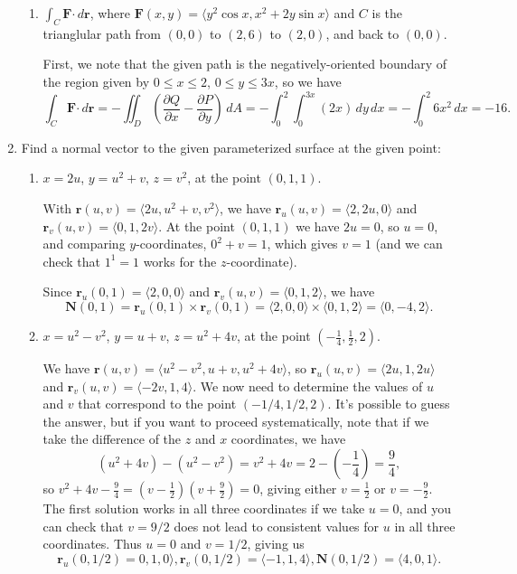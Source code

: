 \documentclass[letterpaper,12pt]{article}
\newcommand{\pd}[2]{\dfrac{\partial #1}{\partial #2}}
\renewcommand{\r}{\mathbf{r}}
\newcommand{\dotp}{\boldsymbol{\cdot}}
\newcommand{\F}{\mathbf{F}}
\newcommand{\N}{\mathbf{N}}
\begin{document}
\begin{enumerate}
\begin{enumerate}
 \item $\int_C \F\dotp \,d\r$, where $\F(x,y) = \langle y^2\cos x, x^2+2y\sin x\rangle$ and $C$ is the trianglular path from $(0,0)$ to $(2,6)$ to $(2,0)$, and back to $(0,0)$.

\bigskip

First, we note that the given path is the negatively-oriented boundary of the region given by $0\leq x\leq 2$, $0\leq y\leq 3x$, so we have
\[
 \int_C \F\dotp \,d\r = -\iint_D\left(\pd{Q}{x}-\pd{P}{y}\right)\,dA = -\int_0^2\int_0^{3x}(2x)\,dy\,dx = -\int_0^2 6x^2\,dx = -16.
\]

\end{enumerate}
 \item Find a normal vector to the given parameterized surface at the given point:
\begin{enumerate}
 \item $x=2u$, $y=u^2+v$, $z=v^2$, at the point $(0,1,1)$.

\bigskip

With $\r(u,v) = \langle 2u, u^2+v,v^2\rangle$, we have $\r_u(u,v) = \langle 2, 2u, 0\rangle$ and $\r_v(u,v) = \langle 0, 1, 2v\rangle$. At the point $(0,1,1)$ we have $2u=0$, so $u=0$, and comparing $y$-coordinates, $0^2+v=1$, which gives $v=1$ (and we can check that $1^1=1$ works for the $z$-coordinate).

Since $\r_u(0,1) = \langle 2, 0, 0\rangle$ and $\r_v(u,v) = \langle 0, 1, 2\rangle$, we have
\[
 \N(0,1) = \r_u(0,1)\times \r_v(0,1) = \langle 2,0,0\rangle\times\langle 0,1,2\rangle = \langle 0,-4,2\rangle.
\]

 \item $x=u^2-v^2$, $y=u+v$, $z=u^2+4v$, at the point $(-\frac{1}{4}, \frac{1}{2}, 2)$.

\bigskip

We have $\r(u,v) = \langle u^2-v^2, u+v,u^2+4v\rangle$, so $\r_u(u,v) = \langle 2u, 1, 2u\rangle$ and $\r_v(u,v) = \langle -2v, 1, 4\rangle$. We now need to determine the values of $u$ and $v$ that correspond to the point $(-1/4, 1/2, 2)$. It's possible to guess the answer, but if you want to proceed systematically, note that if we take the difference of the $z$ and $x$ coordinates, we have
\[
 (u^2+4v)-(u^2-v^2) = v^2+4v= 2-\left(-\frac{1}{4}\right) = \frac{9}{4},
\]
so $v^2+4v-\frac{9}{4} = (v-\frac{1}{2})(v+\frac{9}{2}) = 0$, giving either $v=\frac{1}{2}$ or $v=-\frac{9}{2}$. The first solution works in all three coordinates if we take $u=0$, and you can check that $v=9/2$ does not lead to consistent values for $u$ in all three coordinates. Thus $u=0$ and $v=1/2$, giving us
\[
 \r_u(0,1/2) = 0,1,0\rangle, \r_v(0,1/2) = \langle -1,1,4\rangle, \N(0,1/2) = \langle 4,0,1\rangle.
\]

\end{enumerate}

 \end{enumerate}
\end{document}
